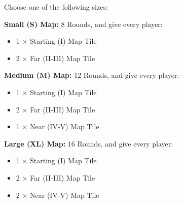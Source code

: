 \begin{multicols*}{2}
Choose one of the following sizes:

\textbf{Small (S) Map:} 8 Rounds, and give every player:
\begin{itemize}
  \item 1 × Starting (I) Map Tile
  \item 2 × Far (II-III) Map Tile
\end{itemize}

\textbf{Medium (M) Map:} 12 Rounds, and give every player:
\begin{itemize}
  \item 1 × Starting (I) Map Tile
  \item 2 × Far (II-III) Map Tile
  \item 1 × Near (IV-V) Map Tile
\end{itemize}

\textbf{Large (XL) Map:} 16 Rounds, and give every player:
\begin{itemize}
  \item 1 × Starting (I) Map Tile
  \item 2 × Far (II-III) Map Tile
  \item 2 × Near (IV-V) Map Tile
\end{itemize}

\medskip


\end{multicols*}

